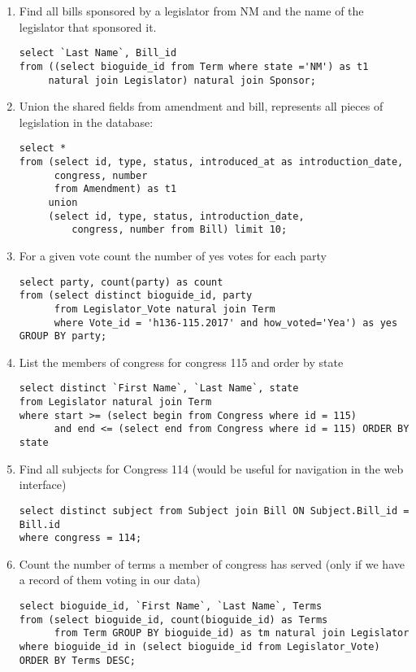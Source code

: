 \documentclass[11pt]{article}
\begin{document}
\begin{enumerate}
\item Find all bills sponsored by a legislator from NM and the name of the
legislator that sponsored it.
\begin{verbatim}
select `Last Name`, Bill_id  
from ((select bioguide_id from Term where state ='NM') as t1 
     natural join Legislator) natural join Sponsor;
\end{verbatim}

\item Union the shared fields from amendment and bill, represents all pieces
of legislation in the database:
\begin{verbatim}
select * 
from (select id, type, status, introduced_at as introduction_date, 
      congress, number 
      from Amendment) as t1 
     union 
     (select id, type, status, introduction_date, 
	     congress, number from Bill) limit 10;
\end{verbatim}

\item For a given vote count the number of yes votes for each party
\begin{verbatim}
select party, count(party) as count 
from (select distinct bioguide_id, party 
      from Legislator_Vote natural join Term 
      where Vote_id = 'h136-115.2017' and how_voted='Yea') as yes 
GROUP BY party;
\end{verbatim}

\item List the members of congress for congress 115 and order by state
\begin{verbatim}
select distinct `First Name`, `Last Name`, state 
from Legislator natural join Term 
where start >= (select begin from Congress where id = 115) 
      and end <= (select end from Congress where id = 115) ORDER BY state
\end{verbatim}

\item Find all subjects for Congress 114 (would be useful for navigation in the web interface)
\begin{verbatim}
select distinct subject from Subject join Bill ON Subject.Bill_id = Bill.id 
where congress = 114;
\end{verbatim}

\item Count the number of terms a member of congress has served 
(only if we have a record of them voting in our data)
\begin{verbatim}
select bioguide_id, `First Name`, `Last Name`, Terms 
from (select bioguide_id, count(bioguide_id) as Terms 
      from Term GROUP BY bioguide_id) as tm natural join Legislator 
where bioguide_id in (select bioguide_id from Legislator_Vote) 
ORDER BY Terms DESC;
\end{verbatim}


\end{enumerate}
\end{document}
